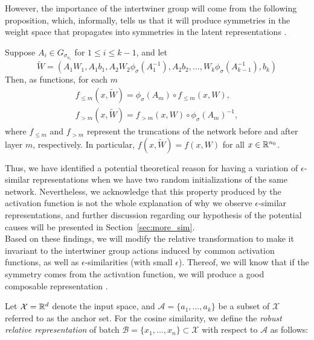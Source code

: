 \documentclass[../main.tex]{subfiles}
\begin{document}
However, the importance of the intertwiner group will come from the following proposition, which, informally, tells us that it will produce symmetries in the weight space that propagates into symmetries in the latent representations \cite{godfrey_symmetries_2023}.

\begin{proposition}
  \label{lem:comm-w-sig}
  Suppose $A_i \in G_{\sigma_{n_i}}$ for $1 \leq i \leq k-1$, and let 
  \begin{equation*}
  \widetilde{W}  = (A_1 W_1, A_1b_1, A_2 W_2 \phi_{\sigma}(A_1^{-1}), A_2 b_2 , \dots,
  W_{k}\phi_{\sigma}(A_{k-1}^{-1}), b_{k})
  \end{equation*}
  Then, as functions, for each $m$
  \begin{gather*}
       f_{\leq m}(x, \widetilde{W} ) = \phi_\sigma(A_m) \circ f_{\leq m}(x, W),\\
       f_{> m}(x, \widetilde{W} ) = f_{>m}(x, W) \circ \phi_{\sigma}(A_m)^{-1},
  \end{gather*}
  where $f_{\leq m}$ and $f_{> m}$ represent the truncations of the network before and after layer $m$, respectively. In particular, $f(x, \widetilde{W} ) = f(x, W)$ for all $x \in \mathbb{R}^{n_0}$.
\end{proposition}

Thus, we have identified a potential theoretical reason for having a variation of $\epsilon$-similar representations when we have two random initializations of the same network. Nevertheless, we acknowledge that this property produced by the activation function is not the whole explanation of why we observe $\epsilon$-similar representations, and further discussion regarding our hypothesis of the potential causes will be presented in Section~\ref{sec:more_sim}.\\

Based on these findings, we will modify the relative transformation to make it invariant to the intertwiner group actions induced by common activation functions, as well as $\epsilon$-similarities (with small $\epsilon$). Thereof, we will know that if the symmetry comes from the activation function, we will produce a good composable representation \cite[Theorem 4.2]{godfrey_symmetries_2023}.

Let $\mathcal{X}=\mathbb{R}^d$ denote the input space, and $\mathcal{A}= \{a_1, ..., a_k\}$ be a subset of $\mathcal{X}$ referred to as the anchor set. For the cosine similarity, we define the \emph{robust relative representation} of batch $\mathcal{B} = \{x_1, ..., x_n\}\subset \mathcal{X}$ with respect to $\mathcal{A}$ as follows:
\end{document}
